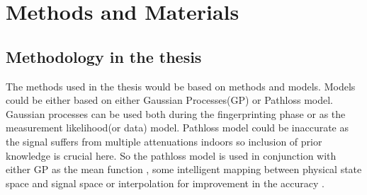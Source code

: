 \section{Methods and Materials}

\subsection{Methodology in the thesis}

The methods used in the thesis would be based on methods and models. Models could be either based on either Gaussian Processes(GP) or Pathloss model. Gaussian processes can be used both during the fingerprinting phase or as the measurement likelihood(or data) model. Pathloss model could be inaccurate as the signal suffers from multiple attenuations indoors so inclusion of prior knowledge is crucial here. So the pathloss model is used in conjunction with either GP as the mean function \cite{yiu}, some intelligent mapping between physical state space and signal space\cite{smailagic} or interpolation for improvement in the accuracy \cite{prasithsangaree}. 


